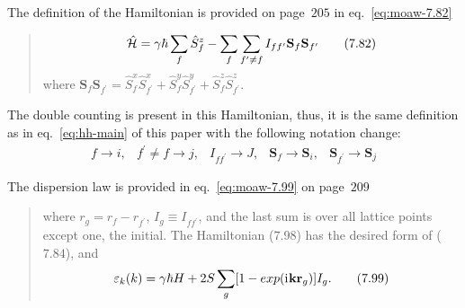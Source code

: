     The definition of the Hamiltonian is provided on page~$205$ in eq.~\eqref{eq:moaw-7.82}

    \begin{quote}
        \begin{equation}
            \hat{\mathcal{H}} = \gamma\hbar\sum_{f}\hat{S}_f^z - \sum_f\sum_{f^{\prime} \ne f} I_{ff^{\prime}}\mathbf{S}_f\mathbf{S}_{f^{\prime}} \label{eq:moaw-7.82} \tag{7.82}
        \end{equation}
        where $\mathbf{S}_f\mathbf{S}_{f^{\prime}} = \hat{S}_f^x\hat{S}_{f^{\prime}}^x + \hat{S}_f^y\hat{S}_{f^{\prime}}^y + \hat{S}_f^z\hat{S}_{f^{\prime}}^z$.
    \end{quote}
    The double counting is present in this Hamiltonian, thus, it is the same definition as in eq.~\eqref{eq:hh-main} of this paper with the following notation change:
    \begin{equation}
        \begin{matrix}
            f \rightarrow i, & 
            f^{\prime} \ne f \rightarrow j, & 
            I_{ff^{\prime}} \rightarrow J, & 
            \mathbf{S}_f \rightarrow \mathbf{S}_i, &
            \mathbf{S}_{f^{\prime}} \rightarrow \mathbf{S}_j
        \end{matrix}
    \end{equation}

    The dispersion law is provided in eq.~\eqref{eq:moaw-7.99} on page~$209$
    \begin{quote}
        where $r_g = r_f - r_{f^{\prime}}$, $I_g \equiv I_{ff^{\prime}}$, and the last sum is over all lattice points except one, the initial. 
        The Hamiltonian ($7.98$) has the desired form of ($7.84$), and
        \begin{equation}
            \varepsilon_k(k) = \gamma\hbar H + 2S \sum_g [1 - exp(\mathrm{i}\mkern1mu \mathbf{k}\mathbf{r}_g)]I_g. \label{eq:moaw-7.99} \tag{7.99}
        \end{equation}
    \end{quote}

